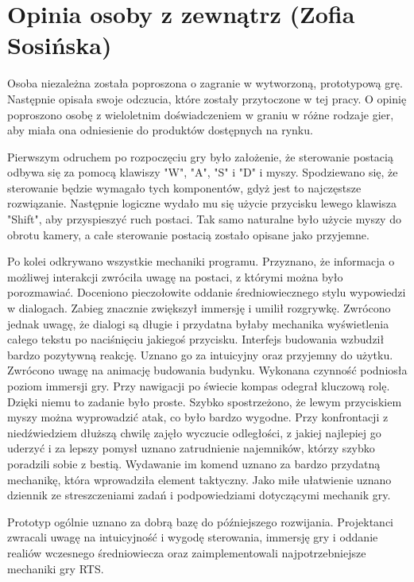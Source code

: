 \section{Opinia osoby z zewnątrz (Zofia Sosińska)}
Osoba niezależna została poproszona o zagranie w wytworzoną, prototypową grę. Następnie opisała swoje odczucia, które zostały przytoczone 
w tej pracy. O opinię poproszono osobę z wieloletnim doświadczeniem w graniu w różne rodzaje gier, aby miała ona odniesienie do produktów
dostępnych na rynku.

Pierwszym odruchem po rozpoczęciu gry było założenie, że sterowanie postacią odbywa się za pomocą klawiszy "W", "A", "S" i "D" i myszy. Spodziewano się, 
że sterowanie będzie wymagało tych komponentów, gdyż jest to najczęstsze rozwiązanie. Następnie logiczne wydało mu się użycie przycisku lewego klawisza "Shift", aby przyspieszyć ruch postaci. 
Tak samo naturalne było użycie myszy do obrotu kamery, a całe sterowanie postacią zostało opisane jako przyjemne.

Po kolei odkrywano wszystkie mechaniki programu. Przyznano, że informacja o możliwej interakcji zwróciła uwagę na postaci, z którymi można było porozmawiać. 
Doceniono pieczołowite oddanie średniowiecznego stylu wypowiedzi w dialogach. Zabieg znacznie zwiększył immersję i umilił rozgrywkę. Zwrócono jednak uwagę,
że dialogi są długie i przydatna byłaby mechanika wyświetlenia całego tekstu po naciśnięciu jakiegoś przycisku. Interfejs budowania wzbudził bardzo pozytywną reakcję.
Uznano go za intuicyjny oraz przyjemny do użytku. Zwrócono uwagę na animację budowania budynku. Wykonana czynność podniosła poziom immersji gry. Przy nawigacji po świecie
kompas odegrał kluczową rolę. Dzięki niemu to zadanie było proste. Szybko spostrzeżono, że lewym przyciskiem myszy można wyprowadzić atak, co było bardzo wygodne. 
Przy konfrontacji z niedźwiedziem dłuższą chwilę zajęło wyczucie odległości, z jakiej najlepiej go uderzyć i za lepszy pomysł uznano zatrudnienie najemników, którzy szybko poradzili
sobie z bestią. Wydawanie im komend uznano za bardzo przydatną mechanikę, która wprowadziła element taktyczny. Jako miłe ułatwienie uznano dziennik ze streszczeniami zadań i 
podpowiedziami dotyczącymi mechanik gry.

Prototyp ogólnie uznano za dobrą bazę do późniejszego rozwijania. Projektanci zwracali uwagę na intuicyjność i wygodę sterowania, immersję gry i oddanie realiów wczesnego średniowiecza
oraz zaimplementowali najpotrzebniejsze mechaniki gry RTS. 
